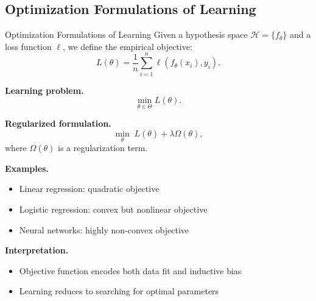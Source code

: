 \documentclass[aspectratio=169,11pt]{beamer}
\begin{document}
\subsection{Optimization Formulations of Learning}
\begin{frame}[t,allowframebreaks]{Optimization Formulations of Learning}
\small
Given a hypothesis space $\mathcal{H} = \{f_\theta\}$ and a loss function $\ell$, we define the empirical objective:
\[
L(\theta) = \frac{1}{n} \sum_{i=1}^n \ell(f_\theta(x_i), y_i).
\]

\textbf{Learning problem.}\\ \[
\min_{\theta \in \Theta} L(\theta).
\]

\textbf{Regularized formulation.}\\ \[
\min_\theta \; L(\theta) + \lambda \Omega(\theta),
\]
where $\Omega(\theta)$ is a regularization term.

\textbf{Examples.}\\ \begin{itemize}
    \item Linear regression: quadratic objective
    \item Logistic regression: convex but nonlinear objective
    \item Neural networks: highly non-convex objective
\end{itemize}

\textbf{Interpretation.}\\ \begin{itemize}
    \item Objective function encodes both data fit and inductive bias
    \item Learning reduces to searching for optimal parameters
\end{itemize}
\end{frame}
\end{document}
